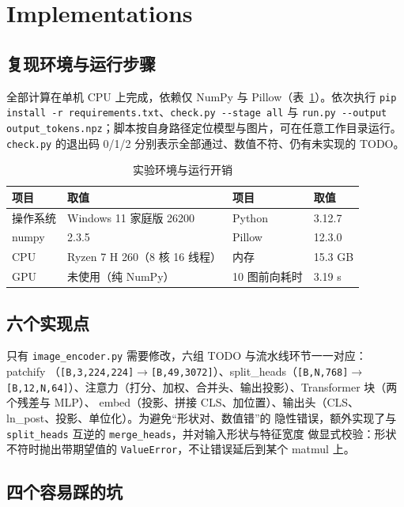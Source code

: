 \documentclass[a4paper,12pt]{article}
\begin{document}
\section{Implementations}

\subsection{复现环境与运行步骤}

全部计算在单机 CPU 上完成，依赖仅 NumPy 与 Pillow（表~\ref{tab:env}）。依次执行
\texttt{pip install -r requirements.txt}、\texttt{check.py -{}-stage all} 与
\texttt{run.py -{}-output output\_tokens.npz}；脚本按自身路径定位模型与图片，可在任意工作目录运行。
\texttt{check.py} 的退出码 0/1/2 分别表示全部通过、数值不符、仍有未实现的 TODO。

\begin{table}[H]
\centering
\caption{实验环境与运行开销}
\label{tab:env}
\small
\begin{tabular}{ll|ll}
\hline
项目 & 取值 & 项目 & 取值 \\
\hline
操作系统 & Windows 11 家庭版 26200 & Python & 3.12.7 \\
numpy & 2.3.5 & Pillow & 12.3.0 \\
CPU & Ryzen 7 H 260（8 核 16 线程） & 内存 & 15.3 GB \\
GPU & 未使用（纯 NumPy） & 10 图前向耗时 & 3.19 s \\
\hline
\end{tabular}
\end{table}

\subsection{六个实现点}

只有 \texttt{image\_encoder.py} 需要修改，六组 TODO 与流水线环节一一对应：patchify
（\texttt{[B,3,224,224]}$\to$\texttt{[B,49,3072]}）、split\_heads（\texttt{[B,N,768]}$\to$
\texttt{[B,12,N,64]}）、注意力（打分、加权、合并头、输出投影）、Transformer 块（两个残差与 MLP）、
embed（投影、拼接 CLS、加位置）、输出头（CLS、ln\_post、投影、单位化）。为避免“形状对、数值错”的
隐性错误，额外实现了与 \texttt{split\_heads} 互逆的 \texttt{merge\_heads}，并对输入形状与特征宽度
做显式校验：形状不符时抛出带期望值的 \texttt{ValueError}，不让错误延后到某个 matmul 上。

\subsection{四个容易踩的坑}
\end{document}
